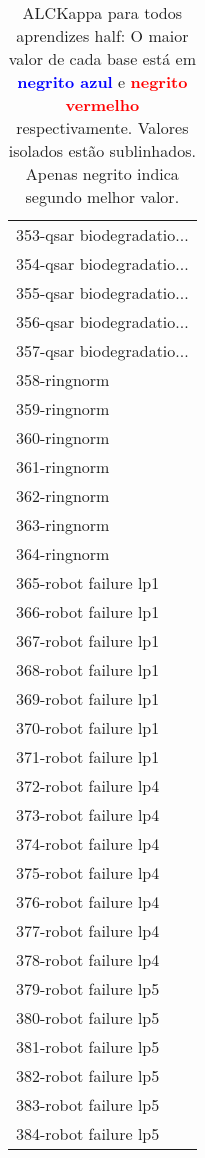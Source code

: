 \begin{table}[h]
\caption{ALCKappa para todos aprendizes half: O maior valor de cada base está em \textcolor{blue}{\textbf{negrito azul}} e \textcolor{red}{\textbf{negrito vermelho}} respectivamente. Valores isolados estão sublinhados. Apenas negrito indica segundo melhor valor.}
\begin{center}\begin{tabular}{l}
 & \\ \hline 353-qsar biodegradatio... &  \\
354-qsar biodegradatio... &  \\
355-qsar biodegradatio... &  \\
356-qsar biodegradatio... &  \\
357-qsar biodegradatio... &  \\
358-ringnorm &  \\
359-ringnorm &  \\ \hline
360-ringnorm &  \\
361-ringnorm &  \\
362-ringnorm &  \\
363-ringnorm &  \\
364-ringnorm &  \\
365-robot failure lp1 &  \\
366-robot failure lp1 &  \\ \hline
367-robot failure lp1 &  \\
368-robot failure lp1 &  \\
369-robot failure lp1 &  \\
370-robot failure lp1 &  \\
371-robot failure lp1 &  \\
372-robot failure lp4 &  \\
373-robot failure lp4 &  \\ \hline
374-robot failure lp4 &  \\
375-robot failure lp4 &  \\
376-robot failure lp4 &  \\
377-robot failure lp4 &  \\
378-robot failure lp4 &  \\
379-robot failure lp5 &  \\
380-robot failure lp5 &  \\ \hline
381-robot failure lp5 &  \\
382-robot failure lp5 &  \\
383-robot failure lp5 &  \\
384-robot failure lp5 &  \\\end{tabular}\label{stratsALCKappa11AllReduxb}
\end{center}
\end{table}
